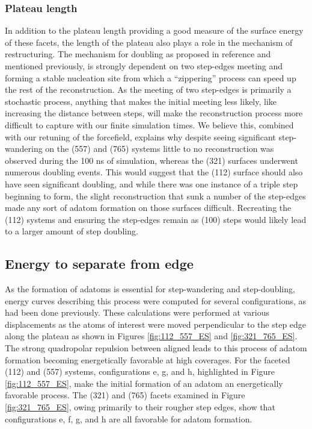 \subsubsection{Plateau length}
In addition to the plateau length providing a good measure of the surface
energy of these facets, the length of the plateau also plays a role in the
mechanism of restructuring. The mechanism for doubling as proposed in reference
\citep{Michalka:2013aa} and mentioned previously, is strongly dependent on
two step-edges meeting and forming a stable nucleation site from which a
``zippering'' process can speed up the rest of the reconstruction. As the
meeting of two step-edges is primarily a stochastic process, anything that
makes the initial meeting less likely, like increasing the distance between
steps, will make the reconstruction process more difficult to capture with our
finite simulation times. We believe this, combined with our retuning of the
 forcefield, explains why despite seeing significant
step-wandering on the (557) and (765) systems little to no reconstruction was
observed during the 100 ns of simulation, whereas the (321) surfaces underwent
numerous doubling events. This would suggest that the (112) surface should also
have seen significant doubling, and while there was one instance of a triple
step beginning to form, the slight reconstruction that sunk a number of the
step-edges made any sort of adatom formation on those surfaces difficult.
Recreating the (112) systems and ensuring the step-edges remain as (100) steps
would likely lead to a larger amount of step doubling.

\subsection{Energy to separate from edge}
As the formation of adatoms is essential for step-wandering and step-doubling,
energy curves describing this process were computed for several 
configurations, as had been done previously.  \citep{Michalka:2015aa,
Michalka:2013aa} These calculations were performed at various displacements as
the atoms of interest were moved perpendicular to the step edge along the
plateau as shown in Figures \ref{fig:112_557_ES} and \ref{fig:321_765_ES}. The
strong quadropolar repulsion between aligned  leads to this process of
adatom formation becoming energetically favorable at high coverages. For the
faceted (112) and (557) systems, configurations e, g, and h, highlighted in
Figure \ref{fig:112_557_ES}, make the initial formation of an adatom an
energetically favorable process. The (321) and (765) facets examined in Figure
\ref{fig:321_765_ES}, owing primarily to their rougher step edges, show that
configurations e, f, g, and h are all favorable for adatom formation.

